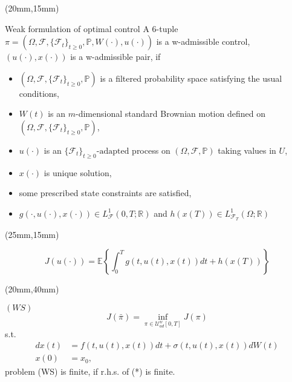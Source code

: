 \begin{frame}[plain]
	\begin{textblock*}{90mm}(20mm,15mm)
		\begin{graybox}{Weak formulation of optimal control}
			 A 6-tuple $\pi=(\Omega,\mathscr{F},\{\mathscr{F}_t\}_{t\geq 0},\mathbb{P},W(\cdot),u(\cdot))$ is a w-admissible control, $(u(\cdot),x(\cdot))$ is a w-admissible pair, if
			\begin{itemize}[<+->]
				\item $(\Omega,\mathscr{F},\{\mathscr{F}_t\}_{t\geq 0},\mathbb{P})$ is a filtered probability space satisfying the usual conditions,
				\item $W(t)$ is an $m$-dimensional standard Brownian motion defined on $(\Omega,\mathscr{F},\{\mathscr{F}_t\}_{t\geq 0},\mathbb{P})$,
				\item $u(\cdot)$ is an $\{\mathscr{F}_t\}_{t\geq 0}\text{-adapted}$ process on $(\Omega,\mathscr{F},\mathbb{P})$ taking values in $U$,
				\item $x(\cdot)$ is unique solution,
				\item some prescribed state constraints are satisfied,
				\item $g(\cdot,u(\cdot),x(\cdot))\in L^1_{\mathscr{F}}(0,T;\mathbb{R})$ and $h(x(T))\in L^1_{\mathscr{F}_T}(\Omega;\mathbb{R})$
			\end{itemize}
		\end{graybox}
	\end{textblock*}
\end{frame}
\begin{frame}[plain]
		\begin{textblock*}{80mm}(25mm,15mm)
		\begin{yellowbox}{}
			\begin{equation*}
				J(u(\cdot))= \mathbb{E}\left\{\int_{0}^{T}g(t,u(t),x(t))dt+h(x(T))\right\}
			\end{equation*}
		\end{yellowbox}
	\end{textblock*}
	
	
	\begin{textblock*}{90mm}(20mm,40mm)
		\begin{graybox}{$(WS)$}
				\begin{equation*}
					J(\bar{\pi})=\inf_{\pi\in \mathcal{U}^w_{ad}[0,T]} J(\pi)
					\tag{*}
				\end{equation*}
				s.t.
				\begin{align*}
					dx(t)&=
					f(t,u(t),x(t))dt+\sigma(t,u(t),x(t))dW(t)\\
					x(0)&=
					x_0,
				\end{align*}
				\tcblower
					problem (WS) is finite, if r.h.s. of (*) is finite. 
			\end{graybox}
	\end{textblock*}
\end{frame}
